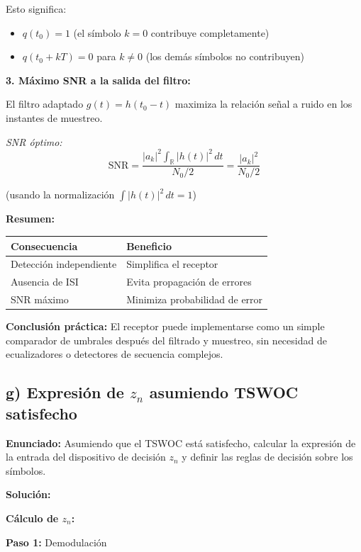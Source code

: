 \documentclass[11pt,a4paper]{article}
\begin{document}
Esto significa:
\begin{itemize}
    \item $q(t_0) = 1$ (el s\'imbolo $k=0$ contribuye completamente)
    \item $q(t_0 + kT) = 0$ para $k \neq 0$ (los dem\'as s\'imbolos no contribuyen)
\end{itemize}

\textbf{3. M\'aximo SNR a la salida del filtro:}

El filtro adaptado $g(t) = h(t_0 - t)$ maximiza la relaci\'on se\~nal a ruido en los instantes de muestreo.

\textit{SNR \'optimo:}
\[
\text{SNR} = \frac{|a_k|^2 \int_{\mathbb{R}} |h(t)|^2\, dt}{N_0/2} = \frac{|a_k|^2}{N_0/2}
\]

(usando la normalizaci\'on $\int |h(t)|^2\, dt = 1$)

\textbf{Resumen:}

\begin{center}
\begin{tabular}{|l|l|}
\hline
\textbf{Consecuencia} & \textbf{Beneficio} \\
\hline
Detecci\'on independiente & Simplifica el receptor \\
Ausencia de ISI & Evita propagaci\'on de errores \\
SNR m\'aximo & Minimiza probabilidad de error \\
\hline
\end{tabular}
\end{center}

\textbf{Conclusi\'on pr\'actica:} El receptor puede implementarse como un simple comparador de umbrales despu\'es del filtrado y muestreo, sin necesidad de ecualizadores o detectores de secuencia complejos.



\subsection*{g) Expresi\'on de $z_n$ asumiendo TSWOC satisfecho}

\textbf{Enunciado:} Asumiendo que el TSWOC est\'a satisfecho, calcular la expresi\'on de la entrada del dispositivo de decisi\'on $z_n$ y definir las reglas de decisi\'on sobre los s\'imbolos.

\vspace{0.3cm}
\textbf{Soluci\'on:}

\textbf{C\'alculo de $z_n$:}

\textbf{Paso 1:} Demodulaci\'on
\end{document}
